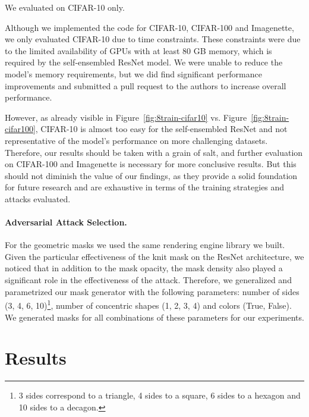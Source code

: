 \documentclass[a4paper, oneside]{discothesis}
\begin{document}
We evaluated on CIFAR-10 only.

Although we implemented the code for CIFAR-10, CIFAR-100 and Imagenette, we only evaluated CIFAR-10 due to time constraints. These constraints were due to the limited availability of GPUs with at least 80 GB memory, which is required by the self-ensembled ResNet model. We were unable to reduce the model's memory requirements, but we did find significant performance improvements and submitted a pull request to the authors to increase overall performance.

However, as already visible in Figure~\ref{fig:8train-cifar10} vs. Figure~\ref{fig:8train-cifar100}, CIFAR-10 is almost too easy for the self-ensembled ResNet and not representative of the model's performance on more challenging datasets. Therefore, our results should be taken with a grain of salt, and further evaluation on CIFAR-100 and Imagenette is necessary for more conclusive results. But this should not diminish the value of our findings, as they provide a solid foundation for future research and are exhaustive in terms of the training strategies and attacks evaluated.

\paragraph{Adversarial Attack Selection.}


For the geometric masks we used the same rendering engine library we built. Given the particular effectiveness of the knit mask on the ResNet architecture, we noticed that in addition to the mask opacity, the mask density also played a significant role in the effectiveness of the attack. Therefore, we generalized and parametrized our mask generator with the following parameters: number of sides (3, 4, 6, 10)\footnote{3 sides correspond to a triangle, 4 sides to a square, 6 sides to a hexagon and 10 sides to a decagon.}, number of concentric shapes (1, 2, 3, 4) and colors (True, False). We generated masks for all combinations of these parameters for our experiments.





\section{Results}
\end{document}

